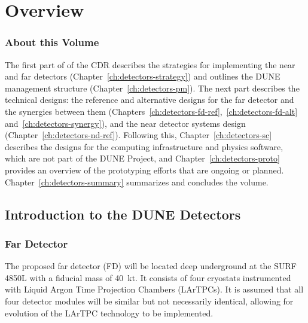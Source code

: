 \chapter{Overview}
\label{ch:detectors-overview}




\subsection{About this Volume}

The first part of \voldune{} of the CDR describes the strategies for
implementing the near and far detectors
(Chapter~\ref{ch:detectors-strategy}) and outlines the DUNE management
structure (Chapter~\ref{ch:detectors-pm}). The next part describes the
technical designs: the reference and alternative designs for the far
detector and the synergies between them
(Chapters~\ref{ch:detectors-fd-ref},~\ref{ch:detectors-fd-alt}
and~\ref{ch:detectors-synergy}), and the near detector systems design
(Chapter~\ref{ch:detectors-nd-ref}).  Following this,
Chapter~\ref{ch:detectors-sc} describes the designs for the computing
infrastructure and physics software,  
which are not part of the DUNE Project, and
Chapter~\ref{ch:detectors-proto} provides an overview of the
prototyping efforts that are ongoing or
planned. Chapter~\ref{ch:detectors-summary} summarizes and concludes
the volume.
 
\section{Introduction to the DUNE Detectors}
\label{sec:intro-dune-det}

\subsection{Far Detector}
\label{sec:intro-dune-far-det}

The proposed far detector (FD) will be located deep underground at the
SURF 4850L with a fiducial mass of 40~kt. It consists of four %
cryostats instrumented with Liquid Argon Time Projection
Chambers (LArTPCs). 
It is assumed that all four detector modules will be similar but not
necessarily identical, allowing for evolution of the LArTPC
technology to be implemented.  %

